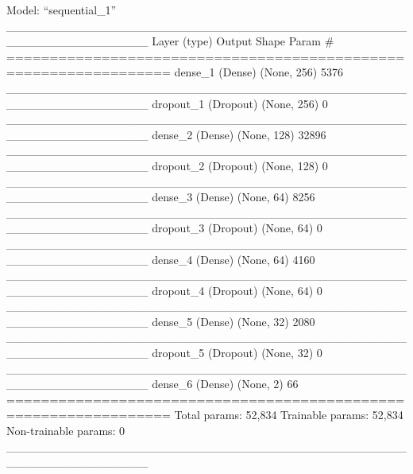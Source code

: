 \documentclass[]{article}
\begin{document}
Model: ``sequential\_1''
\_\_\_\_\_\_\_\_\_\_\_\_\_\_\_\_\_\_\_\_\_\_\_\_\_\_\_\_\_\_\_\_\_\_\_\_\_\_\_\_\_\_\_\_\_\_\_\_\_\_\_\_\_\_\_\_\_\_\_\_\_\_\_\_\_
Layer (type) Output Shape Param \#\\
=================================================================
dense\_1 (Dense) (None, 256) 5376\\
\_\_\_\_\_\_\_\_\_\_\_\_\_\_\_\_\_\_\_\_\_\_\_\_\_\_\_\_\_\_\_\_\_\_\_\_\_\_\_\_\_\_\_\_\_\_\_\_\_\_\_\_\_\_\_\_\_\_\_\_\_\_\_\_\_
dropout\_1 (Dropout) (None, 256) 0\\
\_\_\_\_\_\_\_\_\_\_\_\_\_\_\_\_\_\_\_\_\_\_\_\_\_\_\_\_\_\_\_\_\_\_\_\_\_\_\_\_\_\_\_\_\_\_\_\_\_\_\_\_\_\_\_\_\_\_\_\_\_\_\_\_\_
dense\_2 (Dense) (None, 128) 32896\\
\_\_\_\_\_\_\_\_\_\_\_\_\_\_\_\_\_\_\_\_\_\_\_\_\_\_\_\_\_\_\_\_\_\_\_\_\_\_\_\_\_\_\_\_\_\_\_\_\_\_\_\_\_\_\_\_\_\_\_\_\_\_\_\_\_
dropout\_2 (Dropout) (None, 128) 0\\
\_\_\_\_\_\_\_\_\_\_\_\_\_\_\_\_\_\_\_\_\_\_\_\_\_\_\_\_\_\_\_\_\_\_\_\_\_\_\_\_\_\_\_\_\_\_\_\_\_\_\_\_\_\_\_\_\_\_\_\_\_\_\_\_\_
dense\_3 (Dense) (None, 64) 8256\\
\_\_\_\_\_\_\_\_\_\_\_\_\_\_\_\_\_\_\_\_\_\_\_\_\_\_\_\_\_\_\_\_\_\_\_\_\_\_\_\_\_\_\_\_\_\_\_\_\_\_\_\_\_\_\_\_\_\_\_\_\_\_\_\_\_
dropout\_3 (Dropout) (None, 64) 0\\
\_\_\_\_\_\_\_\_\_\_\_\_\_\_\_\_\_\_\_\_\_\_\_\_\_\_\_\_\_\_\_\_\_\_\_\_\_\_\_\_\_\_\_\_\_\_\_\_\_\_\_\_\_\_\_\_\_\_\_\_\_\_\_\_\_
dense\_4 (Dense) (None, 64) 4160\\
\_\_\_\_\_\_\_\_\_\_\_\_\_\_\_\_\_\_\_\_\_\_\_\_\_\_\_\_\_\_\_\_\_\_\_\_\_\_\_\_\_\_\_\_\_\_\_\_\_\_\_\_\_\_\_\_\_\_\_\_\_\_\_\_\_
dropout\_4 (Dropout) (None, 64) 0\\
\_\_\_\_\_\_\_\_\_\_\_\_\_\_\_\_\_\_\_\_\_\_\_\_\_\_\_\_\_\_\_\_\_\_\_\_\_\_\_\_\_\_\_\_\_\_\_\_\_\_\_\_\_\_\_\_\_\_\_\_\_\_\_\_\_
dense\_5 (Dense) (None, 32) 2080\\
\_\_\_\_\_\_\_\_\_\_\_\_\_\_\_\_\_\_\_\_\_\_\_\_\_\_\_\_\_\_\_\_\_\_\_\_\_\_\_\_\_\_\_\_\_\_\_\_\_\_\_\_\_\_\_\_\_\_\_\_\_\_\_\_\_
dropout\_5 (Dropout) (None, 32) 0\\
\_\_\_\_\_\_\_\_\_\_\_\_\_\_\_\_\_\_\_\_\_\_\_\_\_\_\_\_\_\_\_\_\_\_\_\_\_\_\_\_\_\_\_\_\_\_\_\_\_\_\_\_\_\_\_\_\_\_\_\_\_\_\_\_\_
dense\_6 (Dense) (None, 2) 66\\
================================================================= Total
params: 52,834 Trainable params: 52,834 Non-trainable params: 0
\_\_\_\_\_\_\_\_\_\_\_\_\_\_\_\_\_\_\_\_\_\_\_\_\_\_\_\_\_\_\_\_\_\_\_\_\_\_\_\_\_\_\_\_\_\_\_\_\_\_\_\_\_\_\_\_\_\_\_\_\_\_\_\_\_
\end{document}
